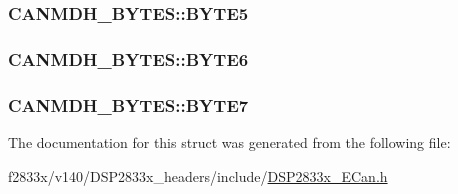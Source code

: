 \subsubsection[{B\+Y\+T\+E5}]{ C\+A\+N\+M\+D\+H\+\_\+\+B\+Y\+T\+E\+S\+::\+B\+Y\+T\+E5}\label{struct_c_a_n_m_d_h___b_y_t_e_s_ab11eea4b3515c79999d4e8ebce5bc482}
\hypertarget{struct_c_a_n_m_d_h___b_y_t_e_s_ad49a573b3d90a866f89afc9253b45810}{}
\subsubsection[{B\+Y\+T\+E6}]{ C\+A\+N\+M\+D\+H\+\_\+\+B\+Y\+T\+E\+S\+::\+B\+Y\+T\+E6}\label{struct_c_a_n_m_d_h___b_y_t_e_s_ad49a573b3d90a866f89afc9253b45810}
\hypertarget{struct_c_a_n_m_d_h___b_y_t_e_s_aa146cf66bb0618cf30344954a52f3228}{}
\subsubsection[{B\+Y\+T\+E7}]{ C\+A\+N\+M\+D\+H\+\_\+\+B\+Y\+T\+E\+S\+::\+B\+Y\+T\+E7}\label{struct_c_a_n_m_d_h___b_y_t_e_s_aa146cf66bb0618cf30344954a52f3228}


The documentation for this struct was generated from the following file\+:\begin{DoxyCompactItemize}
\item 
f2833x/v140/\+D\+S\+P2833x\+\_\+headers/include/\hyperlink{_d_s_p2833x___e_can_8h}{D\+S\+P2833x\+\_\+\+E\+Can.\+h}\end{DoxyCompactItemize}
